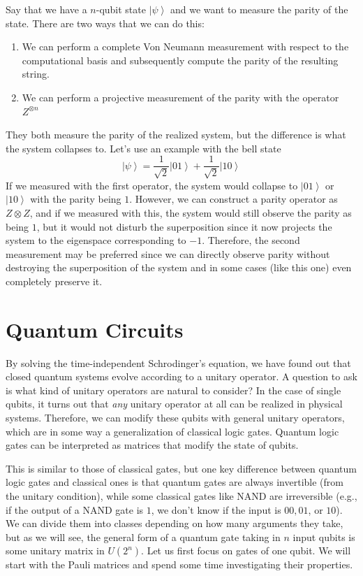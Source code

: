 \documentclass{article}
\newcommand{\ket}[1]{\ensuremath{\left|#1\right\rangle}}
\begin{document}
    \begin{example}
      Say that we have a $n$-qubit state $\ket{\psi}$ and we want to measure the parity of the state. There are two ways that we can do this: 
      \begin{enumerate}
        \item We can perform a complete Von Neumann measurement with respect to the computational basis and subsequently compute the parity of the resulting string. 
        \item We can perform a projective measurement of the parity with the operator $Z^{\otimes n}$ 
      \end{enumerate}
      They both measure the parity of the realized system, but the difference is what the system collapses to. Let's use an example with the bell state 
      \begin{equation} 
        \ket{\psi} = \frac{1}{\sqrt{2}} \ket{01} + \frac{1}{\sqrt{2}} \ket{10}
      \end{equation} 
      If we measured with the first operator, the system would collapse to $\ket{01}$ or $\ket{10}$ with the parity being $1$. However, we can construct a parity operator as $Z \otimes Z$, and if we measured with this, the system would still observe the parity as being $1$, but it would not disturb the superposition since it now projects the system to the eigenspace corresponding to $-1$. Therefore, the second measurement may be preferred since we can directly observe parity without destroying the superposition of the system and in some cases (like this one) even completely preserve it. 
    \end{example}


\section{Quantum Circuits}

  By solving the time-independent Schrodinger's equation, we have found out that closed quantum systems evolve according to a unitary operator. A question to ask is what kind of unitary operators are natural to consider? In the case of single qubits, it turns out that \textit{any} unitary operator at all can be realized in physical systems. Therefore, we can modify these qubits with general unitary operators, which are in some way a generalization of classical logic gates. Quantum logic gates can be interpreted as matrices that modify the state of qubits. 

  This is similar to those of classical gates, but one key difference between quantum logic gates and classical ones is that quantum gates are always invertible (from the unitary condition), while some classical gates like NAND are irreversible (e.g., if the output of a NAND gate is $1$, we don't know if the input is $00, 01$, or $10$). We can divide them into classes depending on how many arguments they take, but as we will see, the general form of a quantum gate taking in $n$ input qubits is some unitary matrix in $U(2^n)$. Let us first focus on gates of one qubit. We will start with the Pauli matrices and spend some time investigating their properties.  
\end{document}
